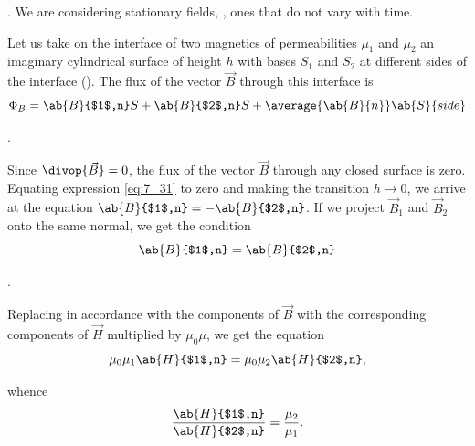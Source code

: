 .
We are considering stationary fields, \ie, ones that do not vary with time.

Let us take on the interface of two magnetics of permeabilities $\mu_1$ and $\mu_2$ an imaginary cylindrical surface of height $h$ with bases $S_1$ and $S_2$ at different sides of the interface ().
The flux of the vector $\vec{B}$ through this interface is
\begin{equation}\label{eq:7_31}
    \Phi_B = \ab{B}{$1$,n} S + \ab{B}{$2$,n} S + \average{\ab{B}{n}} \ab{S}{side}
\end{equation}

.

Since $\divop{\vec{B}}=0$, the flux of the vector $\vec{B}$ through any closed surface is zero.
Equating expression \eqref{eq:7_31} to zero and making the transition $h\to 0$, we arrive at the equation $\ab{B}{$1$,n}=-\ab{B}{$2$,n}$.
If we project $\vec{B}_1$ and $\vec{B}_2$ onto the same normal, we get the condition
\begin{equation}\label{eq:7_32}
    \ab{B}{$1$,n} = \ab{B}{$2$,n}
\end{equation}

.

Replacing in accordance with  the components of $\vec{B}$ with the corresponding components of $\vec{H}$ multiplied by $\mu_0\mu$, we get the equation
\begin{equation*}
    \mu_0\mu_1 \ab{H}{$1$,n} = \mu_0\mu_2 \ab{H}{$2$,n},
\end{equation*}

\noindent
whence
\begin{equation}\label{eq:7_33}
    \frac{\ab{H}{$1$,n}}{\ab{H}{$2$,n}} = \frac{\mu_2}{\mu_1}.
\end{equation}

